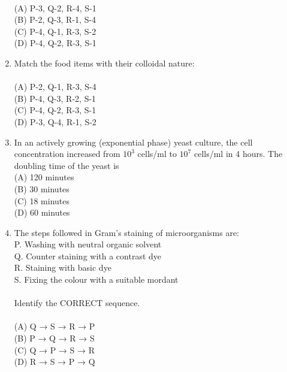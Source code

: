 \documentclass[journal,12pt,onecolumn]{IEEEtran}
\begin{document}
\begin{enumerate}


\vspace{0.2cm}
\hfill{} \\
(A) P-3, Q-2, R-4, S-1 \\
(B) P-2, Q-3, R-1, S-4 \\
(C) P-4, Q-1, R-3, S-2 \\
(D) P-4, Q-2, R-3, S-1
\vspace{0.5cm}

\item Match the food items with their colloidal nature:
\vspace{0.2cm} \\



\vspace{0.2cm}
\hfill{} \\
(A) P-2, Q-1, R-3, S-4 \\
(B) P-4, Q-3, R-2, S-1 \\
(C) P-4, Q-2, R-3, S-1 \\
(D) P-3, Q-4, R-1, S-2
\vspace{0.5cm}

\item In an actively growing (exponential phase) yeast culture, the cell concentration increased from $10^3$ cells/ml to $10^7$ cells/ml in 4 hours. The doubling time of the yeast is
\vspace{0.2cm}
\hfill{} \\
(A) 120 minutes \\
(B) 30 minutes \\
(C) 18 minutes \\
(D) 60 minutes
\vspace{0.5cm}

\item The steps followed in Gram's staining of microorganisms are:
\vspace{0.2cm} \\
P. Washing with neutral organic solvent \\
Q. Counter staining with a contrast dye \\
R. Staining with basic dye \\
S. Fixing the colour with a suitable mordant \\ \\
Identify the CORRECT sequence. \\
\vspace{0.2cm}
\hfill{} \\
(A) Q → S → R → P \\
(B) P → Q → R → S \\
(C) Q → P → S → R \\
(D) R → S → P → Q
\vspace{0.5cm}


\end{enumerate}
\end{document}
